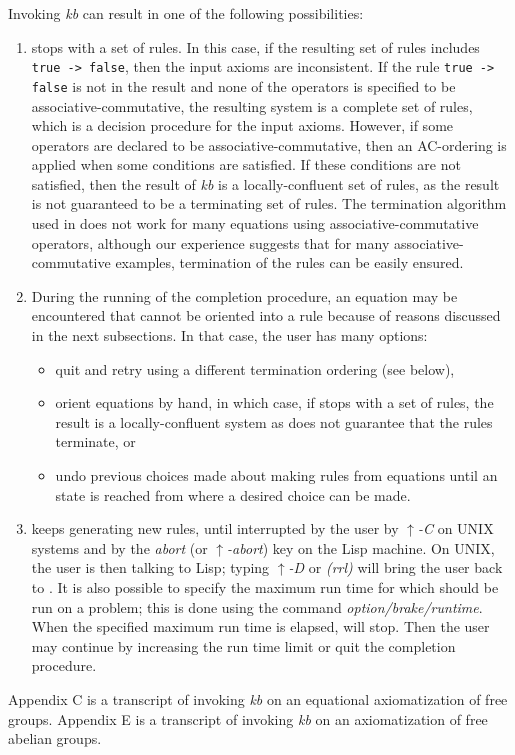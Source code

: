 Invoking {\em kb} can result
in one of the following possibilities:
\begin{enumerate}
\item \RRL stops with a set of rules. In this case,
if the resulting set of rules includes
{\tt true -> false}, then the input axioms are
inconsistent. If the rule {\tt true -> false} is not in
the result and none of the operators is specified
to be associative-commutative, the resulting
system is a complete set of rules,
which is a decision procedure for the input
axioms. However, if some operators are declared
to be associative-commutative, then an AC-ordering
is applied when some conditions are satisfied. 
If these conditions are not satisfied, then the result of {\em kb} is a
locally-confluent set of rules, as the
result is not guaranteed to be a terminating set of rules.
The termination algorithm used
in \RRL does not work for many equations using
associative-commutative operators,
although our experience suggests that for many associative-commutative 
examples, termination of the rules can be easily ensured.
\item During the running of the completion
procedure, an equation may be encountered that cannot
be oriented into a rule because of reasons
discussed in the next subsections. In that case, the user has many
options: 
\begin{itemize}
\item quit and retry using a different
termination ordering (see below), 
\item  orient
equations by hand, in which case, if \RRL stops
with a set of rules, the result is a locally-confluent \cite{Huet80}
system as \RRL does not guarantee that
the rules terminate, or
\item  undo previous choices made about making rules from equations
until an \RRL state is reached
from where a desired choice can be
made.
\end{itemize}
\item \RRL keeps generating new rules, until
interrupted by the user by {\em $\uparrow$-C} on UNIX systems and by
the {\em abort} (or {\em $\uparrow$-abort}) key on the Lisp machine.
On UNIX, the user is then talking to Lisp; typing {\em $\uparrow$-D}
or {\em (rrl)} will bring the user back to \ERRL.  It is also possible
to specify the maximum run time for which \RRL should be run on a
problem; this is done using the command {\em option/brake/runtime}.
When the specified maximum run time is elapsed,
\RRL will stop. Then the user may continue by increasing the run time
limit or quit the
completion procedure.
\end{enumerate}  
Appendix C is a transcript of invoking {\em kb} on an equational
axiomatization of free groups. Appendix E is a transcript of invoking
{\em kb} on an axiomatization of free abelian groups.

